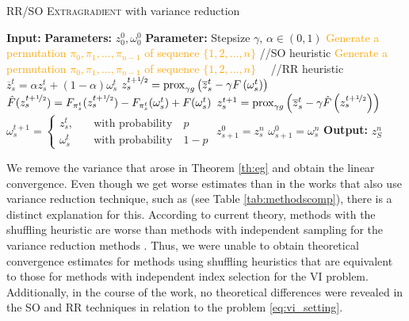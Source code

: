 \documentclass{article}
\begin{document}
\begin{algorithm}[H]
\footnotesize
\caption{RR/SO \textsc{Extragradient} with variance reduction}\label{alg:proxextragradvr}
\begin{algorithmic}[1]
\State \textbf{Input:} \textbf{Parameters:} $z_0^0, \omega_0^0$
\State \textbf{Parameter:} Stepsize $\gamma$, $\alpha \in (0, 1)$ 
\State \textcolor{orange}{Generate a permutation $\pi_0, \pi_1, \ldots, \pi_{n-1}$ of sequence $\{1, 2, \ldots, n\}$} \quad\quad//\quad SO heuristic
    \State \textcolor{orange}{Generate a permutation $\pi_0, \pi_1, \ldots, \pi_{n-1}$ of sequence $\{1, 2, \ldots, n\}$} ~~//\quad RR heuristic
        \State $\overline{z}_s^t = \alpha z_s^t + (1 - \alpha) \omega_s^t$
        \State$z_s^{t+\nicefrac{1}{2}} = \text{prox}_{\gamma g} \left(\overline{z}_s^t - \gamma F\left(\omega_s^t\right)\right)$
        \State $\hat{F}(z_s^{t + \nicefrac{1}{2}}) = F_{\pi_s^t} (z_s^{t + \nicefrac{1}{2}}) - F_{\pi_s^t} (\omega_s^t) + F(\omega_s^t)$
        \State$z_s^{t+1} = \text{prox}_{\gamma g} \left(\overline{z}_s^t - \gamma \hat{F} \left(z_s^{t+\nicefrac{1}{2}}\right)\right)$
        \State\label{alg3:line11} $\omega_s^{t+1} = \begin{cases}
            z_s^t, \quad &\text{with probability}\quad p\\
            \omega_s^t \quad &\text{with probability}\quad 1-p
        \end{cases}$
    \EndFor
    \State $z_{s+1}^0 = z_s^n$
    \State $\omega_{s+1}^0 = \omega_s^n$
\EndFor
\State \textbf{Output:} $z^n_S$
\end{algorithmic}
\end{algorithm}

We remove the variance that arose in Theorem \ref{th:eg} and obtain the linear convergence. Even though we get worse estimates than in the works that also use variance reduction technique, such as \citep{alacaoglu2022stochastic, alacaoglu2021forward, chavdarova2019reducing, palaniappan2016stochastic} (see Table \ref{tab:methodscomp}), there is a distinct explanation for this. According to current theory, methods with the shuffling heuristic are worse than methods with independent sampling for the variance reduction methods \citep{malinovsky2023random}. Thus, we were unable to obtain theoretical convergence estimates for methods using shuffling heuristics that are equivalent to those for methods with independent index selection for the VI problem. Additionally, in the course of the work, no theoretical differences were revealed in the SO and RR techniques in relation to the problem \eqref{eq:vi_setting}.
\end{document}
